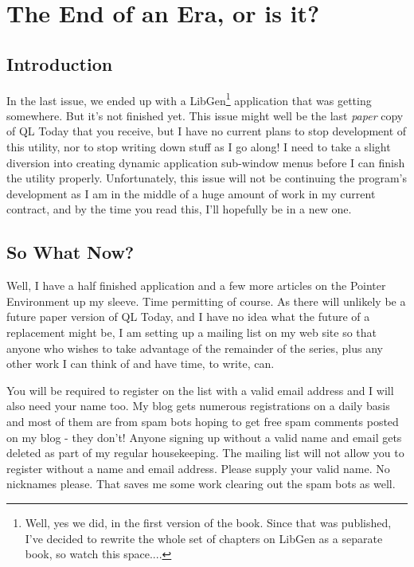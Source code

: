 \chapter{The End of an Era, or is it?}

\section{Introduction}
\label{ch34-intro}%

In the last issue, we ended up with a
 LibGen\footnote{Well, yes we did, in the first version of the book. Since that was published, I've decided to rewrite the whole set of chapters on LibGen as a separate book, so watch this space....} application that was getting somewhere.
    But it's not finished yet. This issue might well be the last
 \emph{paper} copy of QL Today that you receive, but I have
    no current plans to stop development of this utility, nor to stop writing
    down stuff as I go along! I need to take a slight diversion into creating
    dynamic application sub-{}window menus before I can finish the utility
    properly. Unfortunately, this issue will not be continuing the program's
    development as I am in the middle of a huge amount of work in my current
    contract, and by the time you read this, I'll hopefully be in a new
    one.


\section{So What Now?}

Well, I have a half finished application and a few more articles on
    the Pointer Environment up my sleeve. Time permitting of course. As there
    will unlikely be a future paper version of QL Today, and I have no idea
    what the future of a replacement might be, I am setting up a mailing list
    on my web site so that anyone who wishes to take advantage of the
    remainder of the series, plus any other work I can think of and have time,
    to write, can.

You will be required to register on the list with a valid email
    address and I will also need your name too. My blog gets numerous
    registrations on a daily basis and most of them are from spam bots hoping
    to get free spam comments posted on my blog -{} they don't! Anyone signing
    up without a valid name and email gets deleted as part of my regular
    housekeeping. The mailing list will not allow you to register without a
    name and email address. Please supply your valid name. No nicknames
    please. That saves me some work clearing out the spam bots as well.


